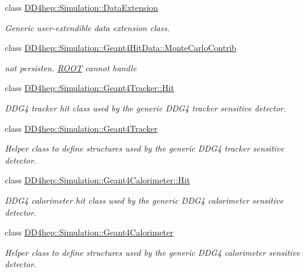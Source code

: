\begin{DoxyCompactItemize}
class \hyperlink{class_d_d4hep_1_1_simulation_1_1_data_extension}{D\+D4hep\+::\+Simulation\+::\+Data\+Extension}
\begin{DoxyCompactList}\small\item\em Generic user-\/extendible data extension class. \end{DoxyCompactList}\item 
class \hyperlink{class_d_d4hep_1_1_simulation_1_1_geant4_hit_data_1_1_monte_carlo_contrib}{D\+D4hep\+::\+Simulation\+::\+Geant4\+Hit\+Data\+::\+Monte\+Carlo\+Contrib}
\begin{DoxyCompactList}\small\item\em not persisten. \hyperlink{namespace_r_o_o_t}{R\+O\+OT} cannot handle \end{DoxyCompactList}\item 
class \hyperlink{class_d_d4hep_1_1_simulation_1_1_geant4_tracker_1_1_hit}{D\+D4hep\+::\+Simulation\+::\+Geant4\+Tracker\+::\+Hit}
\begin{DoxyCompactList}\small\item\em D\+D\+G4 tracker hit class used by the generic D\+D\+G4 tracker sensitive detector. \end{DoxyCompactList}\item 
class \hyperlink{class_d_d4hep_1_1_simulation_1_1_geant4_tracker}{D\+D4hep\+::\+Simulation\+::\+Geant4\+Tracker}
\begin{DoxyCompactList}\small\item\em Helper class to define structures used by the generic D\+D\+G4 tracker sensitive detector. \end{DoxyCompactList}\item 
class \hyperlink{class_d_d4hep_1_1_simulation_1_1_geant4_calorimeter_1_1_hit}{D\+D4hep\+::\+Simulation\+::\+Geant4\+Calorimeter\+::\+Hit}
\begin{DoxyCompactList}\small\item\em D\+D\+G4 calorimeter hit class used by the generic D\+D\+G4 calorimeter sensitive detector. \end{DoxyCompactList}\item 
class \hyperlink{class_d_d4hep_1_1_simulation_1_1_geant4_calorimeter}{D\+D4hep\+::\+Simulation\+::\+Geant4\+Calorimeter}
\begin{DoxyCompactList}\small\item\em Helper class to define structures used by the generic D\+D\+G4 calorimeter sensitive detector. \end{DoxyCompactList}\item 

\end{DoxyCompactItemize}
